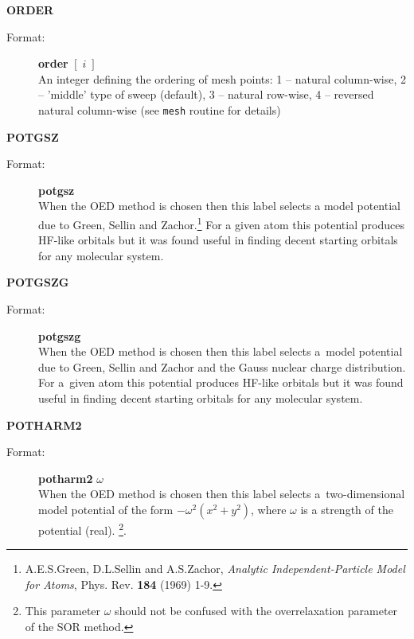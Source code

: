 \documentclass[12pt,a4paper]{article}
\newcommand{\ft}[1]{\texttt{#1}}
\begin{document}
\begin{description}
\item \textbf{ORDER}
\begin{description} 
\item[Format:] \textbf{order} $[\;i\;]$\\ An integer defining the ordering of mesh points:
  1 -- natural column-wise, 2 -- 'middle' type of sweep (default), 3 -- natural
  row-wise, 4 -- reversed natural column-wise (see \ft{mesh} routine for details)
\end{description}



\item \textbf{POTGSZ}
\begin{description} 
\item[Format:] \textbf{potgsz} \\ When the OED method is chosen then this label selects a
  model potential due to Green, Sellin and Zachor.\footnote{A.E.S.Green, D.L.Sellin and
    A.S.Zachor, \textsl{Analytic Independent-Particle Model for Atoms},
    Phys. Rev. \textbf{184} (1969) 1-9.}  For a given atom this potential produces HF-like
  orbitals but it was found useful in finding decent starting orbitals for any molecular
  system.
\end{description} 


\item \textbf{POTGSZG}
\begin{description} 
\item[Format:] \textbf{potgszg} \\ When the OED method is chosen then this label selects
  a~model potential due to Green, Sellin and Zachor and the Gauss nuclear charge
  distribution. For a~given atom this potential produces HF-like orbitals but it was found
  useful in finding decent starting orbitals for any molecular system.
\end{description} 


\item \textbf{POTHARM2}
\begin{description} 
\item[Format:] \textbf{potharm2} $\omega$ \\ When the OED method is chosen then this
  label selects a~two-dimensional model potential of the form $-\omega^2(x^2+y^2)$, where
  $\omega$ is a strength of the potential (real).%
  \footnote{This parameter $\omega$ should not be confused with the
    overrelaxation parameter of the SOR method.}.
\end{description}



\end{description}
\end{document}
